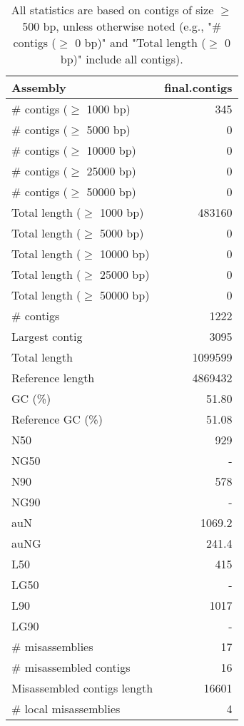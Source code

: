 \documentclass[12pt,a4paper]{article}
\begin{document}
\begin{table}[ht]
\begin{center}
\caption{All statistics are based on contigs of size $\geq$ 500 bp, unless otherwise noted (e.g., "\# contigs ($\geq$ 0 bp)" and "Total length ($\geq$ 0 bp)" include all contigs).}
\begin{tabular}{|l*{1}{|r}|}
\hline
Assembly & final.contigs \\ \hline
\# contigs ($\geq$ 1000 bp) & 345 \\ \hline
\# contigs ($\geq$ 5000 bp) & 0 \\ \hline
\# contigs ($\geq$ 10000 bp) & 0 \\ \hline
\# contigs ($\geq$ 25000 bp) & 0 \\ \hline
\# contigs ($\geq$ 50000 bp) & 0 \\ \hline
Total length ($\geq$ 1000 bp) & 483160 \\ \hline
Total length ($\geq$ 5000 bp) & 0 \\ \hline
Total length ($\geq$ 10000 bp) & 0 \\ \hline
Total length ($\geq$ 25000 bp) & 0 \\ \hline
Total length ($\geq$ 50000 bp) & 0 \\ \hline
\# contigs & 1222 \\ \hline
Largest contig & 3095 \\ \hline
Total length & 1099599 \\ \hline
Reference length & 4869432 \\ \hline
GC (\%) & 51.80 \\ \hline
Reference GC (\%) & 51.08 \\ \hline
N50 & 929 \\ \hline
NG50 & - \\ \hline
N90 & 578 \\ \hline
NG90 & - \\ \hline
auN & 1069.2 \\ \hline
auNG & 241.4 \\ \hline
L50 & 415 \\ \hline
LG50 & - \\ \hline
L90 & 1017 \\ \hline
LG90 & - \\ \hline
\# misassemblies & 17 \\ \hline
\# misassembled contigs & 16 \\ \hline
Misassembled contigs length & 16601 \\ \hline
\# local misassemblies & 4 \\ \hline

\end{tabular}
\end{center}
\end{table}
\end{document}

